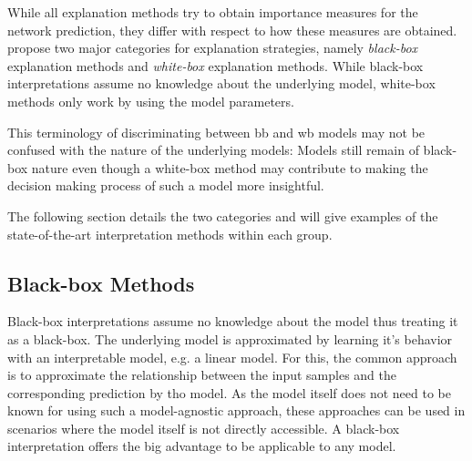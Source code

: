 While all explanation methods try to obtain importance measures for the network prediction, they differ with respect to how these measures are obtained. 
\cite{evaluating_explanations_security} propose two major categories for explanation strategies, namely \textit{black-box} explanation methods and \textit{white-box} explanation methods. 
While black-box interpretations assume no knowledge about the underlying model, white-box methods only work by using the model parameters. 

This terminology of discriminating between bb and wb models may not be confused with the nature of the underlying models: Models still remain of black-box nature even though a white-box method may contribute to making the decision making process of such a model more insightful. %


The following section details the two categories and will give examples of the state-of-the-art interpretation methods within each group. 





\subsection{Black-box Methods} %
\label{subsec:bb_methods}

Black-box interpretations assume no knowledge about the model thus treating it as a black-box. The underlying model is approximated by learning it's behavior with an interpretable model, e.g. a linear model. For this, the common approach is to approximate the relationship between the input samples and the corresponding prediction by tho model.
As the model itself does not need to be known for using such a model-agnostic approach, these approaches can be used in scenarios where the model itself is not directly accessible. A black-box interpretation offers the big advantage to be applicable to any model.


